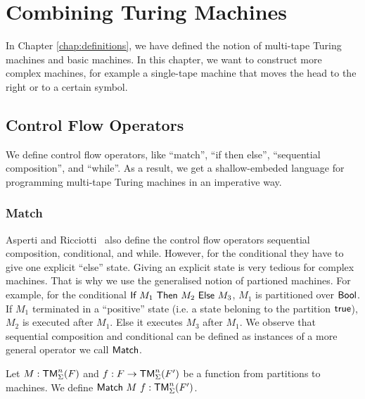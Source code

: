 \chapter{Combining Turing Machines}
\label{chap:combining}

In Chapter \ref{chap:definitions}, we have defined the notion of multi-tape Turing machines and basic machines.  In this chapter, we want to construct
more complex machines, for example a single-tape machine that moves the head to the right or to a certain symbol.

\section{Control Flow Operators}
\label{sec:control}

We define control flow operators, like ``match'', ``if then else'', ``sequential composition'', and ``while''.
As a result, we get a shallow-embeded language for programming multi-tape Turing machines in an imperative way.

\subsection{Match}
\label{sec:match}

Asperti and Ricciotti~\cite{asperti2015} also define the control flow operators sequential composition, conditional, and while.  However, for the
conditional they have to give one explicit ``else'' state.  Giving an explicit state is very tedious for complex machines.  That is why we use the
generalised notion of partioned machines.  For example, for the conditional $\textsf{If}~M_1~\textsf{Then}~M_2~\textsf{Else}~M_3$, $M_1$ is partitioned over $\textsf{Bool}$.  If $M_1$
terminated in a ``positive'' state (i.e. a state beloning to the partition $\textsf{true}$), $M_2$ is executed after $M_1$.  Else it executes $M_3$ after
$M_1$.  We observe that sequential composition and conditional can be defined as instances of a more general operator we call $\textsf{Match}$.

Let $M : \textsf{TM}_\Sigma^n(F)$ and $f : F \rightarrow \textsf{TM}_\Sigma^n(F')$ be a function from partitions to machines.  We define
$\textsf{Match}~M~f : \textsf{TM}_\Sigma^n(F')$.

